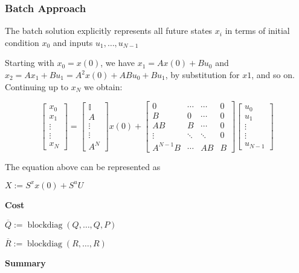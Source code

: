 \subsubsection{Batch Approach}
The batch solution explicitly represents
all future states $x_i$ in terms of
initial condition $x_0$ and inputs $u_1,\dots,u_{N-1}$

Starting with $x_0 = x(0)$,
we have $x_1 = Ax(0) + Bu_0$ and
$x_2 = Ax_1 + Bu_1 = A^2 x(0) + ABu_0 + Bu_1$,
by substitution for $x1$, and so on.
Continuing up to $x_N$ we obtain:

$$ \begin{bmatrix}
		x_0    \\
		x_1    \\
		\vdots \\
		\vdots \\
		x_N
	\end{bmatrix}
	=
	\begin{bmatrix}
		\mathbb{I} \\
		A          \\
		\vdots     \\
		\vdots     \\
		A^N
	\end{bmatrix}
	x(0) +
	\begin{bmatrix}
		0        & \cdots & \cdots & 0 \\
		B        & 0      & \cdots & 0 \\
		AB       & B      & \cdots & 0 \\
		\vdots   & \ddots & \ddots & 0 \\
		A^{N-1}B & \cdots & AB     & B
	\end{bmatrix}
	\begin{bmatrix}
		u_0    \\
		u_1    \\
		\vdots \\
		\vdots \\
		u_{N-1}
	\end{bmatrix} $$

The equation above can be represented as

$X := S^x x(0) + S^u U$

\textbf{Cost}

$\overline{Q} := \mathop{\mathrm{blockdiag}}(Q,\dots, Q,P)$

$\overline{R} := \mathop{\mathrm{blockdiag}}(R,\dots, R)$


\textbf{Summary}

